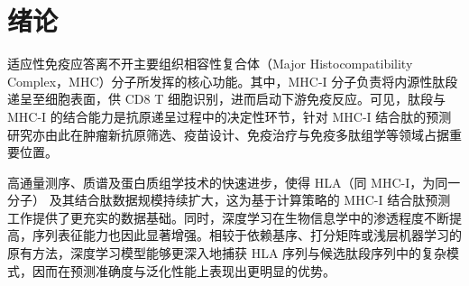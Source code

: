 \chapter{绪论}

    


适应性免疫应答离不开主要组织相容性复合体（Major Histocompatibility Complex，MHC）分子所发挥的核心功能。其中，MHC-I 分子负责将内源性肽段递呈至细胞表面，供 CD8 T 细胞识别，进而启动下游免疫反应\cite{koh2023cd8}。可见，肽段与 MHC-I 的结合能力是抗原递呈过程中的决定性环节，针对 MHC-I 结合肽的预测研究亦由此在肿瘤新抗原筛选、疫苗设计、免疫治疗与免疫多肽组学等领域占据重要位置\cite{xie2023neoantigens}。

高通量测序、质谱及蛋白质组学技术的快速进步，使得 HLA（同 MHC-I，为同一分子） 及其结合肽数据规模持续扩大，这为基于计算策略的 MHC-I 结合肽预测工作提供了更充实的数据基础\cite{vita2025iedb,thibault2022immunopeptidomics}。同时，深度学习在生物信息学中的渗透程度不断提高，序列表征能力也因此显著增强。相较于依赖基序、打分矩阵或浅层机器学习的原有方法，深度学习模型能够更深入地捕获 HLA 序列与候选肽段序列中的复杂模式，因而在预测准确度与泛化性能上表现出更明显的优势\cite{lin2023evolutionary,xu2024immuneapp}。

